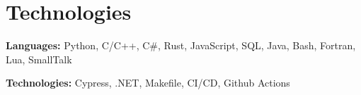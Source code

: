 	\vspace{-0.1 cm}

	\section{Technologies}

	\begin{onecolentry}
		\textbf{Languages:} Python, C/C+\!+, C\#, Rust, JavaScript, SQL, Java, Bash,
		Fortran, Lua, SmallTalk
	\end{onecolentry}

	\begin{onecolentry}
		\textbf{Technologies:} Cypress, .NET, Makefile, CI/CD, Github Actions
	\end{onecolentry}

